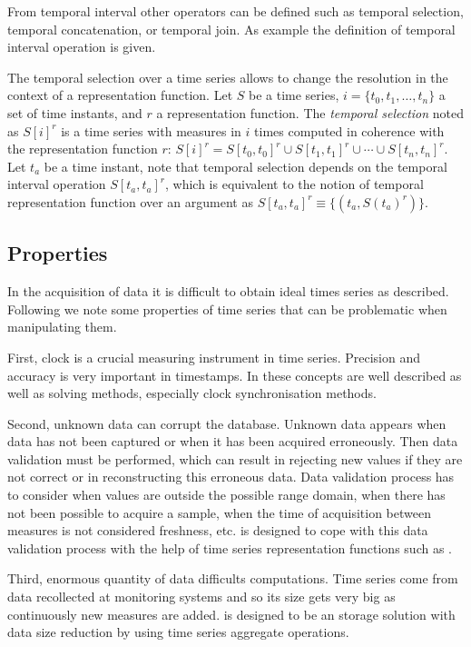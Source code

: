From temporal interval other operators can be defined such as temporal
selection, temporal concatenation, or temporal join. As example the
definition of temporal interval operation is given.


The temporal selection over a time series allows to change the
resolution in the context of a representation function.  Let $S$ be a
time series, $i=\{t_0,t_1,\dotsc,t_n\}$ a set of time instants, and
$r$ a representation function. The \emph{temporal selection} noted as
$S[i]^r$ is a time series with measures in $i$ times computed in
coherence with the representation function $r$: $S[i]^r = S[t_0,t_0]^r
\cup S[t_1,t_1]^r \cup \dotsb \cup S[t_n,t_n]^r$. Let $t_a$ be a time
instant, note that temporal selection depends on the temporal interval
operation $S[t_a,t_a]^r$, which is equivalent to the notion of
temporal representation function over an argument as $S[t_a,t_a]^r
\equiv \{ (t_a, S(t_a)^r) \}$.





\subsection{Properties}
\label{sec:model:properties} 

In the acquisition of data it is difficult to obtain ideal times
series as described. Following we note some properties of time series
that can be problematic when manipulating them.

First, clock is a crucial measuring instrument in time
series. Precision and accuracy is very important in timestamps.  In
\cite{kopetz11:realtime} these concepts are well described as well as
solving methods, especially clock synchronisation methods.


Second, unknown data can corrupt the database. Unknown data appears
when data has not been captured or when it has been acquired
erroneously. Then data validation must be performed, which can result
in rejecting new values if they are not correct or in reconstructing
this erroneous data.  Data validation process has to consider when
values are outside the possible range domain, when there has not been
possible to acquire a sample, when the time of acquisition between
measures is not considered freshness, etc.  is designed to
cope with this data validation process with the help of time series
representation functions such as \zohe{}.


Third, enormous quantity of data difficults computations.  Time series
come from data recollected at monitoring systems and so its size gets
very big as continuously new measures are added.   is
designed to be an storage solution with data size reduction by using
time series aggregate operations.


